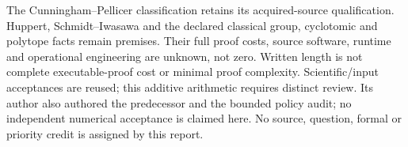 \documentclass[11pt,a4paper]{article}
\begin{document}
The Cunningham--Pellicer classification retains its acquired-source
qualification. Huppert, Schmidt--Iwasawa and the declared classical group,
cyclotomic and polytope facts remain premises. Their full proof costs,
source software, runtime and operational engineering are unknown, not zero.
Written length is not complete executable-proof cost or minimal proof
complexity. Scientific/input acceptances are reused; this additive arithmetic
requires distinct review. Its author also authored the predecessor and the
bounded policy audit; no independent numerical acceptance is claimed here.
No source, question, formal or priority credit is assigned by this report.
\end{document}
